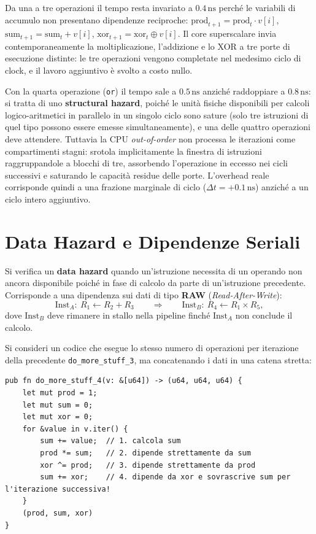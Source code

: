 Da una a tre operazioni il tempo resta invariato a $0.4\,\text{ns}$ perch\'e le variabili di accumulo non presentano dipendenze reciproche: $\text{prod}_{t+1} = \text{prod}_t \cdot v[i]$, $\text{sum}_{t+1} = \text{sum}_t + v[i]$, $\text{xor}_{t+1} = \text{xor}_t \oplus v[i]$. Il core superscalare invia contemporaneamente la moltiplicazione, l'addizione e lo XOR a tre porte di esecuzione distinte: le tre operazioni vengono completate nel medesimo ciclo di clock, e il lavoro aggiuntivo \`e svolto a costo nullo.

Con la quarta operazione (\texttt{or}) il tempo sale a $0.5\,\text{ns}$ anzich\'e raddoppiare a $0.8\,\text{ns}$: si tratta di uno \textbf{structural hazard}, poich\'e le unit\`a fisiche disponibili per calcoli logico-aritmetici in parallelo in un singolo ciclo sono sature (solo tre istruzioni di quel tipo possono essere emesse simultaneamente), e una delle quattro operazioni deve attendere. Tuttavia la CPU \textit{out-of-order} non processa le iterazioni come compartimenti stagni: srotola implicitamente la finestra di istruzioni raggruppandole a blocchi di tre, assorbendo l'operazione in eccesso nei cicli successivi e saturando le capacit\`a residue delle porte. L'overhead reale corrisponde quindi a una frazione marginale di ciclo ($\Delta t = +0.1\,\text{ns}$) anzich\'e a un ciclo intero aggiuntivo.

\FloatBarrier
\section{Data Hazard e Dipendenze Seriali}

\begin{definition}
Si verifica un \textbf{data hazard} quando un'istruzione necessita di un operando non ancora disponibile poich\'e in fase di calcolo da parte di un'istruzione precedente. Corrisponde a una dipendenza sui dati di tipo \textbf{RAW} (\textit{Read-After-Write}):
\[
\text{Inst}_A:\ R_1 \leftarrow R_2 + R_3 \qquad \Longrightarrow \qquad \text{Inst}_B:\ R_4 \leftarrow R_1 \times R_5,
\]
dove $\text{Inst}_B$ deve rimanere in stallo nella pipeline finch\'e $\text{Inst}_A$ non conclude il calcolo.
\end{definition}

Si consideri un codice che esegue lo stesso numero di operazioni per iterazione della precedente \texttt{do\_more\_stuff\_3}, ma concatenando i dati in una catena stretta:

\begin{lstlisting}[style=rustcode,caption={Catena di dipendenza seriale RAW tra quattro operazioni.}]
pub fn do_more_stuff_4(v: &[u64]) -> (u64, u64, u64) {
    let mut prod = 1;
    let mut sum = 0;
    let mut xor = 0;
    for &value in v.iter() {
        sum += value;  // 1. calcola sum
        prod *= sum;   // 2. dipende strettamente da sum
        xor ^= prod;   // 3. dipende strettamente da prod
        sum += xor;    // 4. dipende da xor e sovrascrive sum per l'iterazione successiva!
    }
    (prod, sum, xor)
}
\end{lstlisting}

